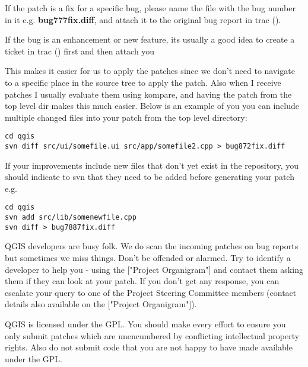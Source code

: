 If the patch is a fix for a specific bug, please name the file with the bug
number in it e.g.  \textbf{bug777fix.diff}, and attach it to the original bug report
in trac ().

If the bug is an enhancement or new feature, its usually a good idea to create
a ticket in trac () first and then attach you 

This makes it easier for us to apply the patches since we don't need to
navigate to a specific place in the source tree to apply the patch. Also when I
receive patches I usually evaluate them using kompare, and having the patch
from the top level dir makes this much easier. Below is an example of you you
can include multiple changed files into your patch from the top level
directory:

\begin{verbatim}
cd qgis
svn diff src/ui/somefile.ui src/app/somefile2.cpp > bug872fix.diff
\end{verbatim}

If your improvements include new files that don't yet exist in the repository,
you should indicate to svn that they need to be added before generating your
patch e.g.

\begin{verbatim}
cd qgis
svn add src/lib/somenewfile.cpp
svn diff > bug7887fix.diff
\end{verbatim}

QGIS developers are busy folk. We do scan the incoming patches on bug reports
but sometimes we miss things.  Don't be offended or alarmed. Try to identify a
developer to help you - using the ["Project Organigram"] and contact them
asking them if they can look at your patch. If you don't get any response, you
can escalate your query to one of the Project Steering Committee members
(contact details also available on the ["Project Organigram"]).

QGIS is licensed under the GPL. You should make every effort to ensure you only
submit patches which are unencumbered by conflicting intellectual property
rights. Also do not submit code that you are not happy to have made available
under the GPL.

